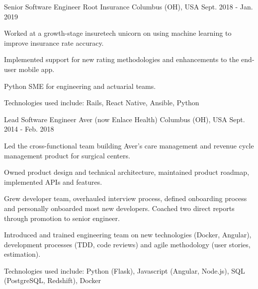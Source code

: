 \begin{cventries}
  \cventry
    {Senior Software Engineer} %
    {Root Insurance} %
    {Columbus (OH), USA} %
    {Sept. 2018 - Jan. 2019} %
    {
      \begin{cvitems} %
        \item {Worked at a growth-stage insuretech unicorn on using machine learning to improve insurance rate accuracy.}
        \item {Implemented support for new rating methodologies and enhancements to the end-user mobile app.}
        \item {Python SME for engineering and actuarial teams.}
        \item {Technologies used include: Rails, React Native, Ansible, Python}
      \end{cvitems}
    }

  \cventry
    {Lead Software Engineer} %
    {Aver (now Enlace Health)} %
    {Columbus (OH), USA} %
    {Sept. 2014 - Feb. 2018} %
    {
      \begin{cvitems} %
        \item {Led the cross-functional team building Aver's care management and revenue cycle management product for surgical centers.}
        \item {Owned product design and technical architecture, maintained product roadmap, implemented APIs and features.}
        \item {Grew developer team, overhauled interview process, defined onboarding process and personally onboarded most new developers. Coached two direct reports through promotion to senior engineer.}
        \item {Introduced and trained engineering team on new technologies (Docker, Angular), development processes (TDD, code reviews) and agile methodology (user stories, estimation).}
        \item {Technologies used include: Python (Flask), Javascript (Angular, Node.js), SQL (PostgreSQL, Redshift), Docker}
      \end{cvitems}
    }


\end{cventries}
